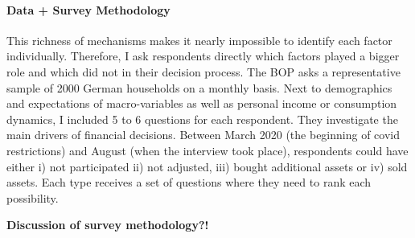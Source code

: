 \documentclass[ProjectABM]{subfiles}
\begin{document}








\paragraph{Data + Survey Methodology}
This richness of mechanisms makes it nearly impossible to identify each factor individually. Therefore, I ask respondents directly which factors played a bigger role and which did not in their decision process. The BOP asks a representative sample of 2000 German households on a monthly basis. Next to demographics and expectations of macro-variables as well as personal income or consumption dynamics, I included 5 to 6 questions for each respondent. They investigate the main drivers of financial decisions. Between March 2020 (the beginning of covid restrictions) and August (when the interview took place), respondents could have either i) not participated ii) not adjusted, iii) bought additional assets or iv) sold assets. Each type receives a set of questions where they need to rank each possibility.

\textbf{Discussion of survey methodology?!}
\end{document}

